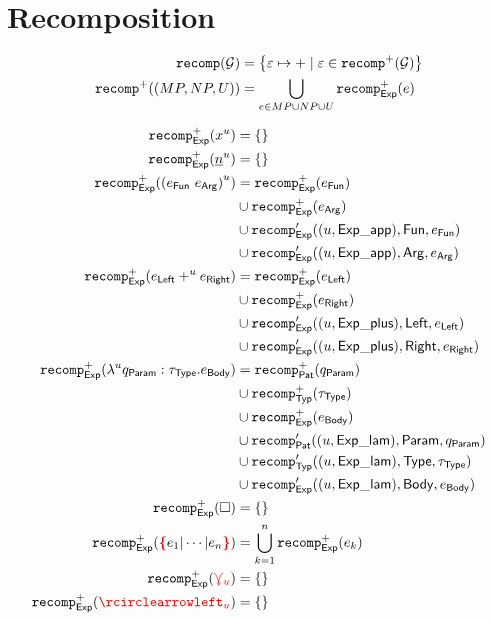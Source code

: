 
\section{Recomposition}


\begin{align*}
  \operatorname{\texttt{recomp}}\mathopen{}\left(\mathcal{G}\right)\mathclose{} &= \left\{\varepsilon \mapsto + \;|\; \varepsilon \in \operatorname{\texttt{recomp}^{+}}\mathopen{}\left(\mathcal{G}\right)\mathclose{}\right\}
  \\
  \operatorname{\texttt{recomp}^{+}}\mathopen{}\left((MP, NP, U)\right)\mathclose{} &= \bigcup_{e \in MP \cup NP \cup U} \operatorname{\texttt{recomp}_{\mathsf{Exp}}^{+}}\mathopen{}\left(e\right)\mathclose{}
\end{align*}

\begin{align*}
  \eRecompPlus{\varExp{x}{u}} &= \{\}
  \\
  \eRecompPlus{\numExp{n}{u}} &= \{\}
  \\
  \eRecompPlus{\appExp{e_\AppFun}{e_\AppArg}{u}}
  &= \eRecompPlus{e_\AppFun} \\
  &\cup \eRecompPlus{e_\AppArg} \\
  &\cup \eRecompPrime{(u, \ExpApp)}{\AppFun}{e_\AppFun} \\
  &\cup \eRecompPrime{(u, \ExpApp)}{\AppArg}{e_\AppArg}
  \\
  \eRecompPlus{\plusExp{e_\PlusLeft}{u}{e_\PlusRight}}
  &= \eRecompPlus{e_\PlusLeft} \\
  &\cup \eRecompPlus{e_\PlusRight} \\
  &\cup \eRecompPrime{(u, \ExpPlus)}{\PlusLeft}{e_\PlusLeft} \\
  &\cup \eRecompPrime{(u, \ExpPlus)}{\PlusRight}{e_\PlusRight}
  \\
  \eRecompPlus{\lamExp{u}{q_\LamParam}{\tau_\LamType}{e_\LamBody}}
  &= \qRecompPlus{q_\LamParam} \\
  &\cup \tRecompPlus{\tau_\LamType} \\
  &\cup \eRecompPlus{e_\LamBody} \\
  &\cup \qRecompPrime{(u, \ExpLam)}{\LamParam}{q_\LamParam} \\
  &\cup \tRecompPrime{(u, \ExpLam)}{\LamType}{\tau_\LamType} \\
  &\cup \eRecompPrime{(u, \ExpLam)}{\LamBody}{e_\LamBody}
  \\
  \eRecompPlus{\hole} &= \{\}
  \\
  \eRecompPlus{\conflictHole{e_1 | \cdots | e_n}}
  &= \bigcup_{k=1}^n \eRecompPlus{e_k}
  \\
  \eRecompPlus{\multiVertex{u}} &= \{\}
  \\
  \eRecompPlus{\cycleVertex{u}} &= \{\}
\end{align*}

